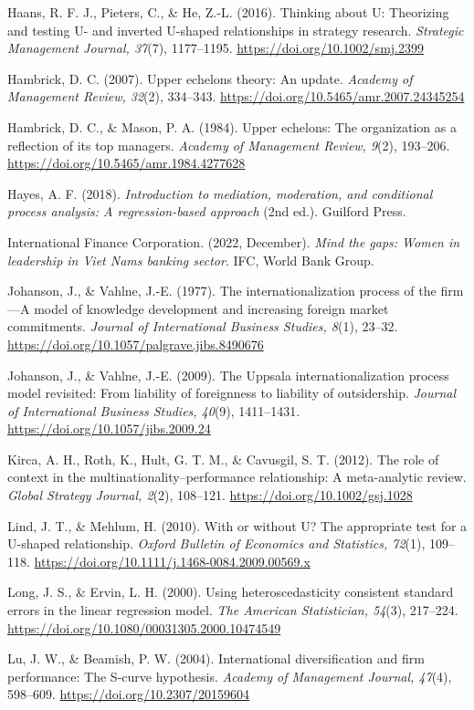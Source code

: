 \documentclass[12pt,a4paper]{article}
\begin{document}
Haans, R. F. J., Pieters, C., \& He, Z.-L. (2016). Thinking about U:
Theorizing and testing U- and inverted U-shaped relationships in
strategy research. \emph{Strategic Management Journal, 37}(7),
1177--1195. \url{https://doi.org/10.1002/smj.2399}

Hambrick, D. C. (2007). Upper echelons theory: An update. \emph{Academy
of Management Review, 32}(2), 334--343.
\url{https://doi.org/10.5465/amr.2007.24345254}

Hambrick, D. C., \& Mason, P. A. (1984). Upper echelons: The
organization as a reflection of its top managers. \emph{Academy of
Management Review, 9}(2), 193--206.
\url{https://doi.org/10.5465/amr.1984.4277628}

Hayes, A. F. (2018). \emph{Introduction to mediation, moderation, and
conditional process analysis: A regression-based approach} (2nd ed.).
Guilford Press.

International Finance Corporation. (2022, December). \emph{Mind the
gaps: Women in leadership in Viet Nam\textquotesingle s banking sector}.
IFC, World Bank Group.

Johanson, J., \& Vahlne, J.-E. (1977). The internationalization process
of the firm---A model of knowledge development and increasing foreign
market commitments. \emph{Journal of International Business Studies,
8}(1), 23--32. \url{https://doi.org/10.1057/palgrave.jibs.8490676}

Johanson, J., \& Vahlne, J.-E. (2009). The Uppsala internationalization
process model revisited: From liability of foreignness to liability of
outsidership. \emph{Journal of International Business Studies, 40}(9),
1411--1431. \url{https://doi.org/10.1057/jibs.2009.24}

Kirca, A. H., Roth, K., Hult, G. T. M., \& Cavusgil, S. T. (2012). The
role of context in the multinationality--performance relationship: A
meta-analytic review. \emph{Global Strategy Journal, 2}(2), 108--121.
\url{https://doi.org/10.1002/gsj.1028}

Lind, J. T., \& Mehlum, H. (2010). With or without U? The appropriate
test for a U-shaped relationship. \emph{Oxford Bulletin of Economics and
Statistics, 72}(1), 109--118.
\url{https://doi.org/10.1111/j.1468-0084.2009.00569.x}

Long, J. S., \& Ervin, L. H. (2000). Using heteroscedasticity consistent
standard errors in the linear regression model. \emph{The American
Statistician, 54}(3), 217--224.
\url{https://doi.org/10.1080/00031305.2000.10474549}

Lu, J. W., \& Beamish, P. W. (2004). International diversification and
firm performance: The S-curve hypothesis. \emph{Academy of Management
Journal, 47}(4), 598--609. \url{https://doi.org/10.2307/20159604}
\end{document}
